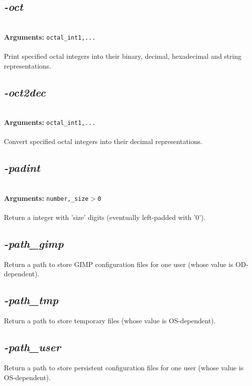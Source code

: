 \documentclass[a4paper,11pt,twoside]{book}
\begin{document}
\subsection{\emph{-oct} }\vspace*{-0.5em}
~\\\textbf{Arguments: } 
{\small \texttt{octal\_int1,...}}\\~\\
Print specified octal integers into their binary, decimal, hexadecimal and string representations.


\subsection{\emph{-oct2dec} }\vspace*{-0.5em}
~\\\textbf{Arguments: } 
{\small \texttt{octal\_int1,...}}\\~\\
Convert specified octal integers into their decimal representations.


\subsection{\emph{-padint} }\vspace*{-0.5em}
~\\\textbf{Arguments: } 
{\small \texttt{number,\_size$>$0}}\\~\\
Return a integer with 'size' digits (eventually left-padded with '0').


\subsection{\emph{-path\_gimp} }\vspace*{-0.5em}
Return a path to store GIMP configuration files for one user (whose value is OD-dependent).


\subsection{\emph{-path\_tmp} }\vspace*{-0.5em}
Return a path to store temporary files (whose value is OS-dependent).


\subsection{\emph{-path\_user} }\vspace*{-0.5em}
Return a path to store persistent configuration files for one user (whose value is OS-dependent).
\end{document}
